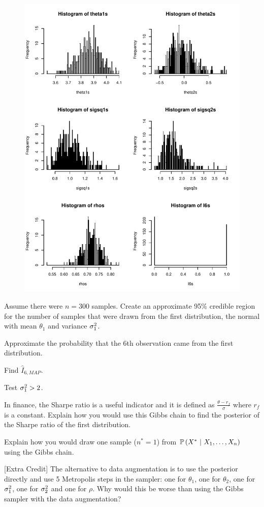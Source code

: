 \documentclass[12pt]{article}
\begin{document}
\begin{figure}[h]
\centering
\includegraphics[width=4.5in]{gibbs_res}
\end{figure}
\FloatBarrier

\benum
\vspace{-1.0cm}
 Assume there were $n = 300$ samples. Create an approximate 95\% credible region for the number of samples that were drawn from the first distribution, the normal with mean $\theta_1$ and variance $\sigma^2_1$. 

 Approximate the probability that the 6th observation came from the first distribution. 

 Find $\hat{I}_{6, MAP}$. 

 Test $\sigma^2_1 > 2$. 

 In finance, the Sharpe ratio is a useful indicator and it is defined as $\frac{\theta - r_f}{\sigma}$ where $r_f$ is a constant. Explain how you would use this Gibbs chain to find the posterior of the Sharpe ratio of the first distribution.

 Explain how you would draw one sample ($n^* = 1$) from $\mathbb{P}\left(X^*~|~X_1, \ldots, X_n\right)$ using the Gibbs chain. 

 [Extra Credit] The alternative to data augmentation is to use the posterior directly and use 5 Metropolis steps in the sampler: one for $\theta_1$, one for $\theta_2$, one for $\sigma^2_1$, one for $\sigma^2_2$ and one for $\rho$. Why would this be worse than using the Gibbs sampler with the data augmentation? 


\eenum
\end{document}
